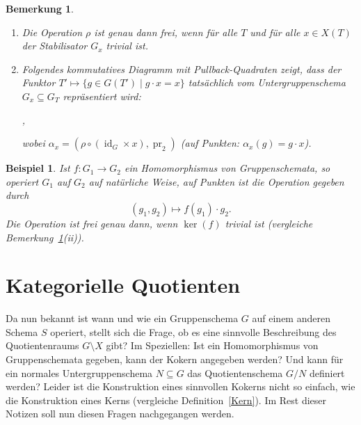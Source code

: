 \documentclass[DIV11,11pt]{scrartcl}
\theoremstyle{Definitionen}
\newtheorem{Bem}[Def]{Bemerkung}
\newtheorem{Bsp}[Def]{Beispiel}
\theoremstyle{Aussagen}
\DeclareMathOperator{\id}{id}
\DeclareMathOperator{\pr}{pr}
\begin{document}
\begin{Bem}\label{BemOp}
\begin{enumerate}
\item Die Operation $\rho$ ist genau dann frei, wenn für alle $T$ und für alle $x\in X(T)$ der Stabilisator $G_x$ trivial ist.
\item Folgendes kommutatives Diagramm mit Pullback-Quadraten zeigt, dass der Funktor $T'\mapsto\{g\in G(T')\mid g\cdot x=x\}$ tatsächlich vom Untergruppenschema $G_x\subseteq G_T$ repräsentiert wird:
\begin{center},\end{center}
wobei $\alpha_x =(\rho\circ(\id_G\times x),\pr_2)$ (auf Punkten: $\alpha_x(g)=g\cdot x$).
\end{enumerate}
\end{Bem}

\begin{Bsp}
Ist $f\colon G_1\rightarrow G_2$ ein Homomorphismus von Gruppenschemata, so operiert $G_1$ auf $G_2$ auf natürliche Weise, auf Punkten ist die Operation gegeben durch
\begin{displaymath}
(g_1,g_2)\mapsto f(g_1)\cdot g_2.
\end{displaymath}
Die Operation ist frei genau dann, wenn $\ker(f)$ trivial ist (vergleiche Bemerkung~\ref{BemOp}(ii)).
\end{Bsp}


\section{Kategorielle Quotienten}\label{KatQuot}
Da nun bekannt ist wann und wie ein Gruppenschema $G$ auf einem anderen Schema $S$ operiert, stellt sich die Frage, ob es eine sinnvolle Beschreibung des Quotientenraums $G\setminus X$ gibt? Im Speziellen: Ist ein Homomorphismus von Gruppenschemata gegeben, kann der Kokern angegeben werden? Und kann für ein normales Untergruppenschema $N\subseteq G$ das Quotientenschema $G/N$ definiert werden? Leider ist die Konstruktion eines sinnvollen Kokerns nicht so einfach, wie die Konstruktion eines Kerns (vergleiche Definition~\ref{Kern}). Im Rest dieser Notizen soll nun diesen Fragen nachgegangen werden.
\end{document}

